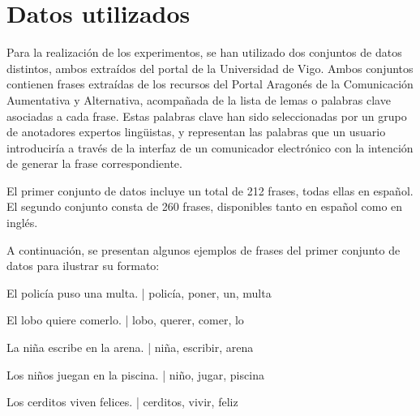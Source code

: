 \documentclass[11pt,spanish,listoffigures,listoftables]{tfgetsinf}
\begin{document}
\section{Datos utilizados}

Para la realización de los experimentos, se han utilizado dos conjuntos de datos distintos, ambos extraídos del portal de la Universidad de Vigo. Ambos conjuntos contienen frases extraídas de los recursos del Portal Aragonés de la Comunicación Aumentativa y Alternativa, acompañada de la lista de lemas o palabras clave asociadas a cada frase. Estas palabras clave han sido seleccionadas por un grupo de anotadores expertos lingüistas, y representan las palabras que un usuario introduciría a través de la interfaz de un comunicador electrónico con la intención de generar la frase correspondiente.

El primer conjunto de datos incluye un total de 212 frases, todas ellas en español. El segundo conjunto consta de 260 frases, disponibles tanto en español como en inglés.

A continuación, se presentan algunos ejemplos de frases del primer conjunto de datos para ilustrar su formato:



\begin{displayquote}

El policía puso una multa. | policía, poner, un, multa

El lobo quiere comerlo. | lobo, querer, comer, lo

La niña escribe en la arena. | niña, escribir, arena

Los niños juegan en la piscina. | niño, jugar, piscina

Los cerditos viven felices. | cerditos, vivir, feliz

\end{displayquote}
\end{document}
